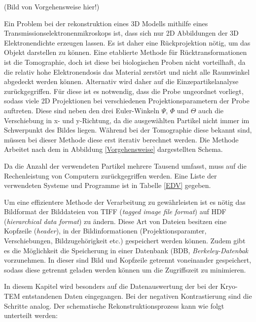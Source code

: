 (Bild von Vorgehensweise hier!)

Ein Problem bei der rekonstruktion eines 3D Modells mithilfe eines Transmissionselektronenmikroskops ist, dass sich nur 2D Abbildungen der 3D Elektronendichte erzeugen lassen.
Es ist daher eine Rückprojektion nötig, um das Objekt darstellen zu können.
Eine etablierte Methode für Rücktransformationen ist die Tomographie, doch ist diese bei biologischen Proben nicht vorteilhaft, da die relativ hohe Elektronendosis das Material zerstört und nicht alle Raumwinkel abgedeckt werden können.
Alternativ wird daher auf die Einzepartikelanalyse zurückgegriffen.
Für diese ist es notwendig, dass die Probe ungeordnet vorliegt, sodass viele 2D Projektionen bei verschiedenen Projektionsparametern der Probe auftreten.
Diese sind neben den drei Euler-Winkeln $\Psi$, $\Phi$ und $\Theta$ auch die Verschiebung in x- und y-Richtung, da die ausgewählten Partikel nicht immer im Schwerpunkt des Bildes liegen.
Während bei der Tomographie diese bekannt sind, müssen bei dieser Methode diese erst iterativ berechnet werden.
Die Methode Arbeitet nach dem in Abbildung \ref{Vorgehensweise} dargestellten Schema.

Da die Anzahl der verwendeten Partikel mehrere Tausend umfasst, muss auf die Rechenleistung von Computern zurückgegriffen werden.
Eine Liste der verwendeten Systeme und Programme ist in Tabelle \ref{EDV} gegeben.

Um eine effizientere Methode der Verarbeitung zu gewährleisten ist es nötig das Bildformat der Bilddateien von TIFF (\textit{tagged image file format}) auf HDF (\textit{hierarchical data format}) zu ändern.
Diese Art von Dateien besitzen eine Kopfzeile (\textit{header}), in der Bildinformationen (Projektionsparamter, Verschiebungen, Bildzugehörigkeit etc.) gespeichert werden können.
Zudem gibt es die Möglichkeit die Speicherung in einer Datenbank (BDB, \textit{Berkeley-Datenbak} vorzunehmen.
In dieser sind Bild und Kopfzeile getrennt voneinander gespeichert, sodass diese getrennt geladen werden können um die Zugriffszeit zu minimieren.

In diesem Kapitel wird besonders auf die Datenauswertung der bei der Kryo-TEM entstandenen Daten eingegangen.
Bei der negativen Kontrastierung sind die Schritte analog. 
Der schematische Rekonstruktionsprozess kann wie folgt unterteilt werden:

